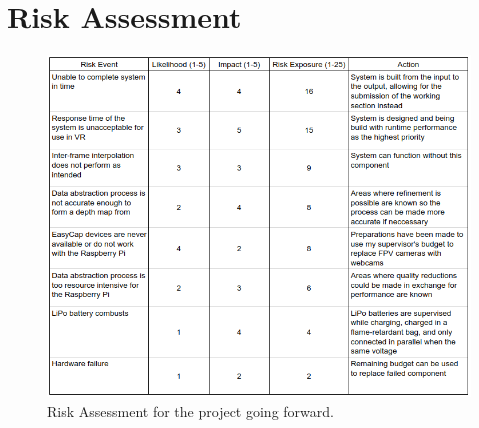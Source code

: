 \chapter{Risk Assessment}

\begin{figure}[H]
    \begin{center}
      \includegraphics[width=\textwidth]{Figures/RiskAssessment.png}
      \caption[Risk Assessment]{Risk Assessment for the project going forward.}
      \label{fig:Risk}
    \end{center}
\end{figure}
